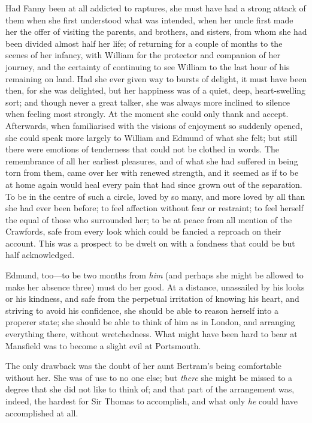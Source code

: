 \documentclass{article}
\begin{document}
Had Fanny been at all addicted to raptures, she must have
had a strong attack of them when she first understood
what was intended, when her uncle first made her the offer
of visiting the parents, and brothers, and sisters,
from whom she had been divided almost half her life;
of returning for a couple of months to the scenes of
her infancy, with William for the protector and companion
of her journey, and the certainty of continuing to see
William to the last hour of his remaining on land.
Had she ever given way to bursts of delight, it must have
been then, for she was delighted, but her happiness was
of a quiet, deep, heart-swelling sort; and though never
a great talker, she was always more inclined to silence
when feeling most strongly.  At the moment she could
only thank and accept.  Afterwards, when familiarised
with the visions of enjoyment so suddenly opened, she could
speak more largely to William and Edmund of what she felt;
but still there were emotions of tenderness that could
not be clothed in words.  The remembrance of all her
earliest pleasures, and of what she had suffered in being
torn from them, came over her with renewed strength,
and it seemed as if to be at home again would heal
every pain that had since grown out of the separation.
To be in the centre of such a circle, loved by so many,
and more loved by all than she had ever been before;
to feel affection without fear or restraint; to feel
herself the equal of those who surrounded her; to be at
peace from all mention of the Crawfords, safe from every
look which could be fancied a reproach on their account.
This was a prospect to be dwelt on with a fondness that could
be but half acknowledged.

Edmund, too---to be two months from \emph{him} (and perhaps
she might be allowed to make her absence three)
must do her good.  At a distance, unassailed by his looks
or his kindness, and safe from the perpetual irritation
of knowing his heart, and striving to avoid his confidence,
she should be able to reason herself into a properer state;
she should be able to think of him as in London,
and arranging everything there, without wretchedness.
What might have been hard to bear at Mansfield was to become
a slight evil at Portsmouth.

The only drawback was the doubt of her aunt Bertram's being
comfortable without her.  She was of use to no one else;
but \emph{there} she might be missed to a degree that she did
not like to think of; and that part of the arrangement
was, indeed, the hardest for Sir Thomas to accomplish,
and what only \emph{he} could have accomplished at all.
\end{document}
